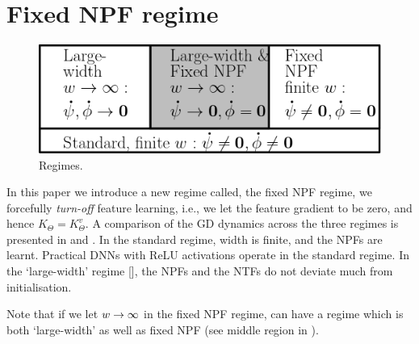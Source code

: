 \section{Fixed NPF regime}
\begin{figure}
\includegraphics[scale=0.25]{figs/regime.png}
\caption{\label{fig:regime} Regimes.}
\end{figure}
In this paper we introduce a new regime called, the fixed NPF regime, we forcefully \emph{turn-off} feature learning, i.e., we let the feature gradient to be zero, and hence $K_{\Theta}=K^v_{\Theta}$. 
A comparison of the GD dynamics across the three regimes is presented in  and . In the standard regime, width is finite, and the NPFs are learnt. Practical DNNs with ReLU activations operate in the standard regime. In the `large-width' regime [], the NPFs and the NTFs do not deviate much from initialisation.

 Note that if we let $w\rightarrow\infty$ in the fixed NPF regime, can have a regime which is both `large-width' as well as fixed NPF (see middle region in ). 
\FloatBarrier
\begin{table}[h]\centering
{}
\caption{Dynamics in various regimes. Here $p\in[P], s\in[n]$.}
\label{tb:dynamics}
\end{table}

